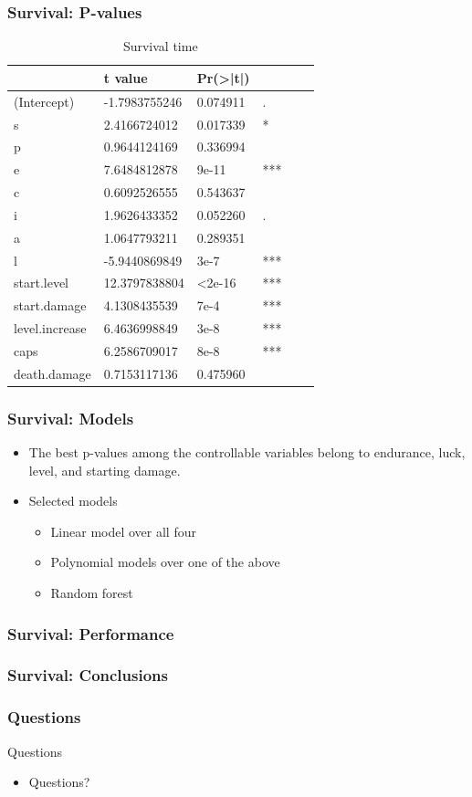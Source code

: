 \documentclass{beamer}
\begin{document}
\begin{frame}
  \frametitle{Survival: P-values}
  \begin{table}[]
    \centering
    \caption{Survival time}
    \label{table:survival.time}
    \begin{tabular}{l|lllll}
      &t value&Pr(>|t|)& \\ 
      \hline
      (Intercept)    &  -1.7983755246 & 0.074911&. \\ 
      s              &  2.4166724012  & 0.017339 &*\\
      p              &  0.9644124169  & 0.336994 &\\
      e              &  7.6484812878  & 9e-11&*** \\
      c              &  0.6092526555  & 0.543637& \\
      i              &  1.9626433352  & 0.052260& .\\
      a              &  1.0647793211  & 0.289351& \\
      l              &  -5.9440869849 & 3e-7&*** \\
      start.level    &  12.3797838804 & <2e-16&*** \\
      start.damage   &  4.1308435539  & 7e-4&*** \\
      level.increase &  6.4636998849  & 3e-8 &***\\
      caps           &  6.2586709017  & 8e-8&*** \\
      death.damage   &  0.7153117136  & 0.475960&\\
      \hline
    \end{tabular}
  \end{table}
\end{frame}


\begin{frame}
  \frametitle{Survival: Models}
  \begin{itemize}
  \item The best p-values among the controllable variables belong to endurance, luck, level, and starting damage.
  \item Selected models
    \begin{itemize}
    \item Linear model over all four
    \item Polynomial models over one of the above
    \item Random forest
    \end{itemize}
  \end{itemize}
\end{frame}


\begin{frame}
  \frametitle{Survival: Performance}
  
\end{frame}


\begin{frame}
  \frametitle{Survival: Conclusions}
  
\end{frame}


\begin{frame}
  \frametitle{Questions}
  {\Huge Questions}
  \begin{itemize}
  \item Questions?
  \end{itemize}

\end{frame}
\end{document}
